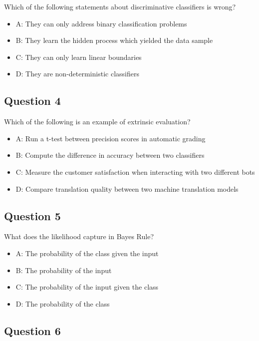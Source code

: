\documentclass[
  11pt,
  british,
]{article}
\providecommand{\tightlist}{%
  \setlength{\itemsep}{0pt}\setlength{\parskip}{0pt}}
\begin{document}
Which of the following statements about discriminative classifiers is
wrong?

\begin{itemize}
\tightlist
\item
  A: They can only address binary classification problems
\item
  B: They learn the hidden process which yielded the data sample
\item
  C: They can only learn linear boundaries
\item
  D: They are non-deterministic classifiers
\end{itemize}

\hypertarget{question-4-1}{%
\subsection{Question 4}\label{question-4-1}}

Which of the following is an example of extrinsic evaluation?

\begin{itemize}
\tightlist
\item
  A: Run a t-test between precision scores in automatic grading
\item
  B: Compute the difference in accuracy between two classifiers
\item
  C: Measure the customer satisfaction when interacting with two
  different bots
\item
  D: Compare translation quality between two machine translation models
\end{itemize}

\hypertarget{question-5-1}{%
\subsection{Question 5}\label{question-5-1}}

What does the likelihood capture in Bayes Rule?

\begin{itemize}
\tightlist
\item
  A: The probability of the class given the input
\item
  B: The probability of the input
\item
  C: The probability of the input given the class
\item
  D: The probability of the class
\end{itemize}

\hypertarget{question-6-1}{%
\subsection{Question 6}\label{question-6-1}}
\end{document}
